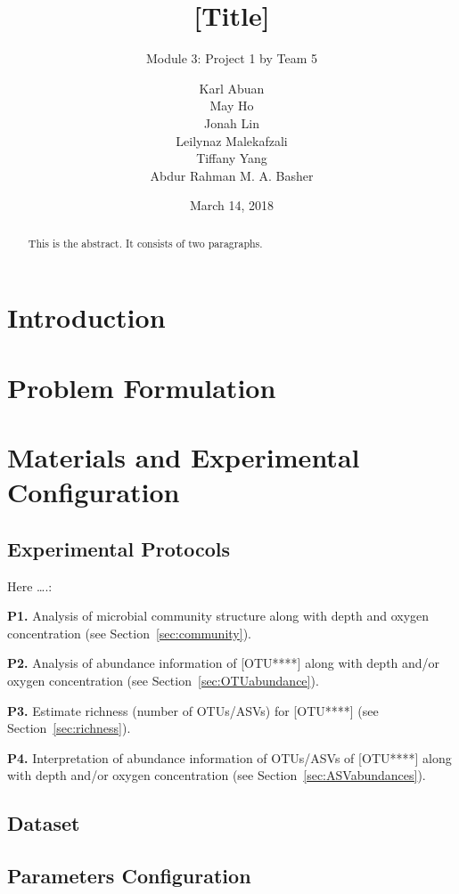 \documentclass[11 pt,]{article}
\title{{[}Title{]}}
\subtitle{Module 3: Project 1 by Team 5}
\author{Karl Abuan \\ May Ho \\ Jonah Lin \\ Leilynaz Malekafzali \\ Tiffany Yang \\ Abdur Rahman M. A. Basher}
\date{March 14, 2018}
\newcommand*{\secref}[1]{Section~\ref{#1}}
\begin{document}
\maketitle
\begin{abstract}
This is the abstract. It consists of two paragraphs.
\end{abstract}

{
\hypersetup{linkcolor=black}
\setcounter{tocdepth}{3}
\tableofcontents
}
\section{Introduction}\label{introduction}

\section{Problem Formulation}\label{problem-formulation}

\section{Materials and Experimental
Configuration}\label{materials-and-experimental-configuration}

\subsection{Experimental Protocols}\label{experimental-protocols}

Here \ldots{}.:

\textbf{P1.} Analysis of microbial community structure along with depth
and oxygen concentration (see \secref{sec:community}).

\textbf{P2.} Analysis of abundance information of {[}OTU****{]} along
with depth and/or oxygen concentration (see \secref{sec:OTUabundance}).

\textbf{P3.} Estimate richness (number of OTUs/ASVs) for {[}OTU****{]}
(see \secref{sec:richness}).

\textbf{P4.} Interpretation of abundance information of OTUs/ASVs of
{[}OTU****{]} along with depth and/or oxygen concentration (see
\secref{sec:ASVabundances}).

\subsection{Dataset}\label{dataset}

\subsection{Parameters Configuration}\label{parameters-configuration}
\end{document}
